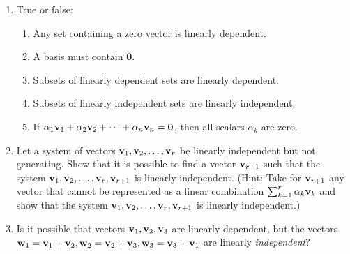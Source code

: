 \documentclass[../psets.tex]{subfiles}
\begin{document}
\begin{enumerate}[label={\textbf{2.\arabic*.}}]
    \item True or false:
    \begin{enumerate}
        \item Any set containing a zero vector is linearly dependent.
        \item A basis must contain $\bm{0}$.
        \item Subsets of linearly dependent sets are linearly dependent.
        \item Subsets of linearly independent sets are linearly independent.
        \item If $\alpha_1\mathbf{v}_1+\alpha_2\mathbf{v}_2+\cdots+\alpha_n\mathbf{v}_n=\mathbf{0}$, then all scalars $\alpha_k$ are zero.
    \end{enumerate}
    \setcounter{enumi}{4}
    \item Let a system of vectors $\mathbf{v}_1,\mathbf{v}_2,\dots,\mathbf{v}_r$ be linearly independent but not generating. Show that it is possible to find a vector $\mathbf{v}_{r+1}$ such that the system $\mathbf{v}_1,\mathbf{v}_2,\dots,\mathbf{v}_r,\mathbf{v}_{r+1}$ is linearly independent. (Hint: Take for $\mathbf{v}_{r+1}$ any vector that cannot be represented as a linear combination $\sum_{k=1}^r\alpha_k\mathbf{v}_k$ and show that the system $\mathbf{v}_1,\mathbf{v}_2,\dots,\mathbf{v}_r,\mathbf{v}_{r+1}$ is linearly independent.)
    \item Is it possible that vectors $\mathbf{v}_1,\mathbf{v}_2,\mathbf{v}_3$ are linearly dependent, but the vectors $\mathbf{w}_1=\mathbf{v}_1+\mathbf{v}_2,\mathbf{w}_2=\mathbf{v}_2+\mathbf{v}_3,\mathbf{w}_3=\mathbf{v}_3+\mathbf{v}_1$ are linearly \emph{independent}?
\end{enumerate}
\end{document}

